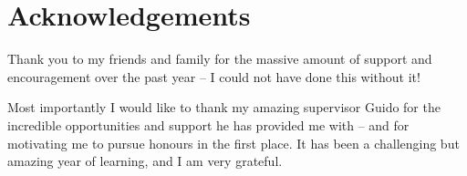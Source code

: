 \documentclass[12pt,a4paper]{book}
\begin{document}
\chapter*{Acknowledgements}
Thank you to my friends and family for the massive amount of support and encouragement over the past year -- I could not have done this without it!

Most importantly I would like to thank my amazing supervisor Guido for the incredible opportunities and support he has provided me with -- and for motivating me to pursue honours in the first place. It has been a challenging but amazing year of learning, and I am very grateful.


\tableofcontents











\end{document}
